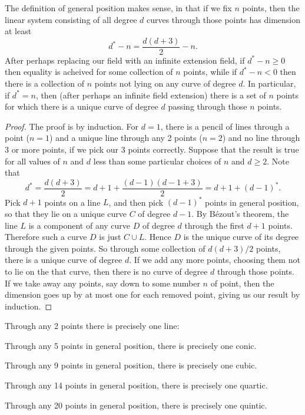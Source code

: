 \begin{lemma}\label{lemma:general.position.defined}
The definition of general position makes sense, in that if we fix \(n\) points, then the linear system consisting of all degree \(d\) curves through those points has dimension at least 
\[
d^*-n=\frac{d(d+3)}{2}-n.
\]
After perhaps replacing our field with an infinite extension field, if \(d^*-n \ge 0 \) then equality is acheived for some collection of \(n\) points, while if \(d^*-n<0\) then there is a collection of \(n\) points not lying on any curve of degree \(d\).
In particular, if \(d^*=n\), then (after perhaps an infinite field extension) there is a set of \(n\) points for which there is a unique curve of degree \(d\) passing through those \(n\) points.
\end{lemma}
\begin{proof}
The proof is by induction.
For \(d=1\), there is a pencil of lines through a point (\(n=1\)) and a unique line through any 2 points (\(n=2\)) and no line through 3 or more points, if we pick our 3 points correctly.
Suppose that the result is true for all values of \(n\) and \(d\) less than some particular choices of \(n\) and \(d \ge 2\).
Note that 
\[
d^*=\frac{d(d+3)}{2} = d+1+\frac{(d-1)(d-1+3)}{2} = d+1+(d-1)^*.
\]
Pick \(d+1\) points on a line \(L\), and then pick \((d-1)^*\) points in general position, so that they lie on a unique curve \(C\) of degree \(d-1\).
By B\'ezout's theorem, the line \(L\) is a component of any curve \(D\) of degree \(d\) through the first \(d+1\) points.
Therefore such a curve \(D\) is just \(C \cup L\).
Hence \(D\) is the unique curve of its degree through the given points.
So through some collection of \(d(d+3)/2\) points, there is a unique curve of degree \(d\).
If we add any more points, choosing them not to lie on the that curve, then there is no curve of degree \(d\) through those points.
If we take away any points, say down to some number \(n\) of point, then the dimension goes up by at most one for each removed point, giving us our result by induction.
\end{proof}
 
\begin{example}
Through any 2 points there is precisely one line: 
\end{example}
\begin{example}
Through any 5 points in general position, there is precisely one conic.
\end{example}
\begin{example}
Through any 9 points in general position, there is precisely one cubic.
\end{example}
\begin{example}
Through any 14 points in general position, there is precisely one quartic.
\end{example}
\begin{example}
Through any 20 points in general position, there is precisely one quintic.
\end{example}

